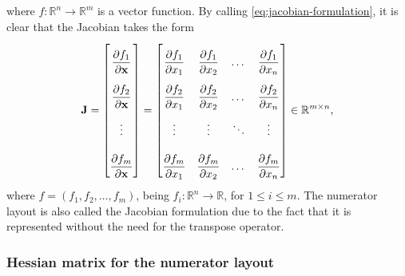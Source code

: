 \documentclass{article}
\begin{document}
where \(f: \mathbb{R}^{n} \rightarrow \mathbb{R}^{m}\) is a vector function. By calling \eqref{eq:jacobian-formulation}, it is clear that the Jacobian takes the form
\begin{align}
    \label{eq:jacobian-matrix}
    \mathbf{J} = \renewcommand{\arraystretch}{2.6} \begin{bmatrix}
        \dfrac{\partial f_1}{\partial \mathbf{x}} \\
        \dfrac{\partial f_2}{\partial \mathbf{x}} \\ 
        \vdots \\ 
        \dfrac{\partial f_m}{\partial \mathbf{x}}
    \end{bmatrix} = \begin{bmatrix}
        \dfrac{\partial f_1}{\partial x_1} & \dfrac{\partial f_1}{\partial x_2} & \dots & \dfrac{\partial f_1}{\partial x_n} \\
        \dfrac{\partial f_2}{\partial x_1} & \dfrac{\partial f_2}{\partial x_2} & \dots & \dfrac{\partial f_2}{\partial x_n} \\
        \vdots & \vdots & \ddots & \vdots \\
        \dfrac{\partial f_m}{\partial x_1} & \dfrac{\partial f_m}{\partial x_2} & \dots & \dfrac{\partial f_m}{\partial x_n} \\
    \end{bmatrix} \in \mathbb{R}^{m \times n},
\end{align}
where \(f = (f_1, f_2, \dots, f_m)\), being \(f_i: \mathbb{R}^n \rightarrow \mathbb{R}\), for \(1 \leq i \leq m\). The numerator layout is also called the Jacobian formulation due to the fact that it is represented without the need for the transpose operator.

\subsubsection{Hessian matrix for the numerator layout}
\end{document}
